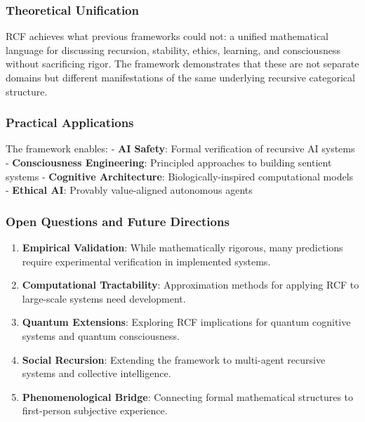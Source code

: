 \documentclass[
]{article}
\begin{document}
\subsubsection{Theoretical Unification}\label{theoretical-unification}

RCF achieves what previous frameworks could not: a unified mathematical
language for discussing recursion, stability, ethics, learning, and
consciousness without sacrificing rigor. The framework demonstrates that
these are not separate domains but different manifestations of the same
underlying recursive categorical structure.

\subsubsection{Practical Applications}\label{practical-applications}

The framework enables: - \textbf{AI Safety}: Formal verification of
recursive AI systems - \textbf{Consciousness Engineering}: Principled
approaches to building sentient systems - \textbf{Cognitive
Architecture}: Biologically-inspired computational models -
\textbf{Ethical AI}: Provably value-aligned autonomous agents

\subsubsection{Open Questions and Future
Directions}\label{open-questions-and-future-directions}

\begin{enumerate}
\def\labelenumi{\arabic{enumi}.}
\item
  \textbf{Empirical Validation}: While mathematically rigorous, many
  predictions require experimental verification in implemented systems.
\item
  \textbf{Computational Tractability}: Approximation methods for
  applying RCF to large-scale systems need development.
\item
  \textbf{Quantum Extensions}: Exploring RCF implications for quantum
  cognitive systems and quantum consciousness.
\item
  \textbf{Social Recursion}: Extending the framework to multi-agent
  recursive systems and collective intelligence.
\item
  \textbf{Phenomenological Bridge}: Connecting formal mathematical
  structures to first-person subjective experience.
\end{enumerate}
\end{document}

